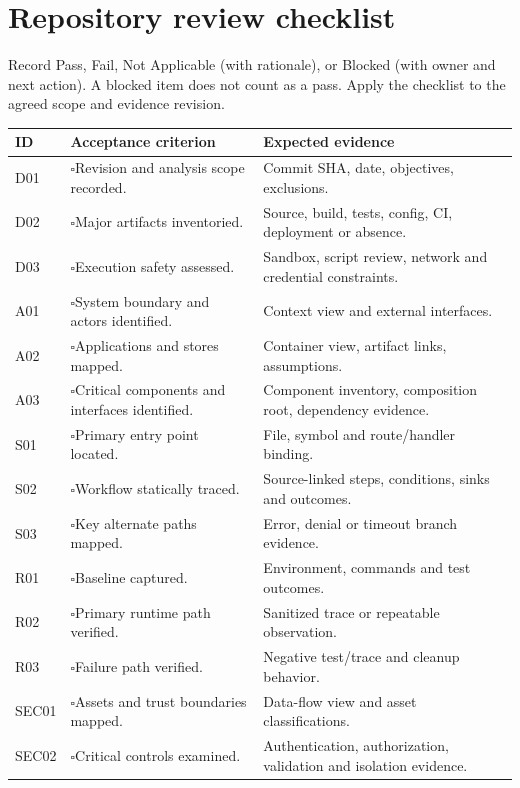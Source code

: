 \documentclass[11pt,letterpaper]{article}
\newcommand{\checkitem}[1]{\(\square\)\hspace{0.4em}#1}
\begin{document}
\section{Repository review checklist}
Record Pass, Fail, Not Applicable (with rationale), or Blocked (with owner and next action). A blocked item does not count as a pass. Apply the checklist to the agreed scope and evidence revision.
\begin{longtable}{@{}P{0.48in}P{3.0in}P{2.75in}@{}}
\color{white}\textbf{ID}&\color{white}\textbf{Acceptance criterion}&\color{white}\textbf{Expected evidence}\\\endhead
D01 & \checkitem{Revision and analysis scope recorded.} & Commit SHA, date, objectives, exclusions.\\
D02 & \checkitem{Major artifacts inventoried.} & Source, build, tests, config, CI, deployment or absence.\\
D03 & \checkitem{Execution safety assessed.} & Sandbox, script review, network and credential constraints.\\
A01 & \checkitem{System boundary and actors identified.} & Context view and external interfaces.\\
A02 & \checkitem{Applications and stores mapped.} & Container view, artifact links, assumptions.\\
A03 & \checkitem{Critical components and interfaces identified.} & Component inventory, composition root, dependency evidence.\\
S01 & \checkitem{Primary entry point located.} & File, symbol and route/handler binding.\\
S02 & \checkitem{Workflow statically traced.} & Source-linked steps, conditions, sinks and outcomes.\\
S03 & \checkitem{Key alternate paths mapped.} & Error, denial or timeout branch evidence.\\
R01 & \checkitem{Baseline captured.} & Environment, commands and test outcomes.\\
R02 & \checkitem{Primary runtime path verified.} & Sanitized trace or repeatable observation.\\
R03 & \checkitem{Failure path verified.} & Negative test/trace and cleanup behavior.\\
SEC01 & \checkitem{Assets and trust boundaries mapped.} & Data-flow view and asset classifications.\\
SEC02 & \checkitem{Critical controls examined.} & Authentication, authorization, validation and isolation evidence.\\

\end{longtable}
\end{document}
